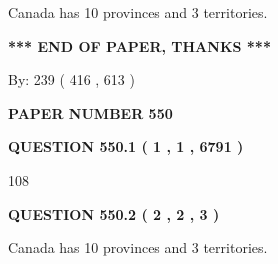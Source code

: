 \documentclass[12pt]{article}
\begin{document}
 
Canada has 10  provinces and 3 territories.
 
 
 
 
   
   
 \vspace{0.2in}
 
   
   
   
   
\vspace{1.0in} 
{\textbf{\large{ *** END OF PAPER, THANKS *** }}} 
   
   
\hspace{1.0in} By: 
 239 ( 416 ,  613 )
   
   
   
   
\newpage 
\setcounter{page}{ 
   550001 } 
   
   
   
   
 {\textbf{ \Large{ PAPER NUMBER  550  }}}
   
   
\vspace{0.2in}
   
   
   
   
   
   
 \vspace{0.2in}
 
 
 
 
   
   
  
\vspace{0.2in}
  
{\textbf{\Large{QUESTION
550.1 
 ( 1 , 1 , 6791 )
}}}
  
  
 
 
\noindent{}

108
 
 
  
\vspace{0.2in}
  
{\textbf{\Large{QUESTION
550.2 
 ( 2 , 2 , 3 )
}}}
  
  
 
 
\noindent{}
 
 
Canada has 10  provinces and 3 territories.
 
 
 
 
   
   
 \vspace{0.2in}
 
\end{document}
